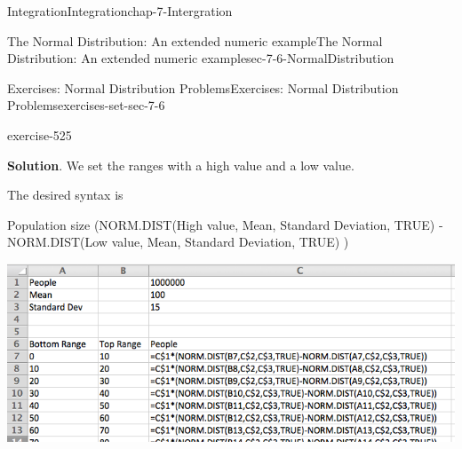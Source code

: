 \documentclass[oneside,10pt,]{book}
\numberwithin{equation}{section}
\begin{document}
\begin{chapterptx}{Integration}{}{Integration}{}{}{chap-7-Intergration}
\begin{sectionptx}{The Normal Distribution: An extended numeric example}{}{The Normal Distribution: An extended numeric example}{}{}{sec-7-6-NormalDistribution}
\begin{exercises-subsection-numberless}{Exercises: Normal Distribution Problems}{}{Exercises: Normal Distribution Problems}{}{}{exercises-set-sec-7-6}
\begin{divisionexercise}{9}{}{}{exercise-525}
\par\smallskip%
\noindent\textbf{Solution}.\hypertarget{solution-266}{}\quad%
\hypertarget{p-2991}{}%
We set the ranges with a high value and a low value.%
\par
\hypertarget{p-2992}{}%
The desired syntax is%
\par
\hypertarget{p-2993}{}%
Population size \textasteriskcentered{} (NORM.DIST(High value, Mean, Standard Deviation, TRUE) - NORM.DIST(Low value, Mean, Standard Deviation, TRUE) )%
\begin{sidebyside}{1}{0.1}{0.1}{0}%
\begin{sbspanel}{0.8}%
\includegraphics[width=1\linewidth]{images/sec7-6-sol9a.png}
\end{sbspanel}%
\end{sidebyside}%
\begin{sidebyside}{1}{0.3}{0.3}{0}%
\begin{sbspanel}{0.4}%

\end{sbspanel}
\end{sidebyside}
\end{divisionexercise}
\end{exercises-subsection-numberless}
\end{sectionptx}
\end{chapterptx}
\end{document}
